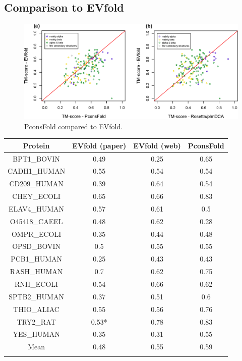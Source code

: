 \documentclass{bioinfo}
\begin{document}
\subsection{Comparison to EVfold}

\begin{figure}[!tpb]%
    \centerline{\includegraphics[scale=0.35]{figures/vs.eps}}
\caption{PconsFold compared to EVfold.}\label{fig:vs}
\end{figure}

\begin{table}[!t]
{\begin{tabular}{cccc}\toprule
    Protein      & EVfold (paper) & EVfold (web) & PconsFold \\ \midrule
    BPT1\_BOVIN  & 0.49   & 0.25           & 0.65      \\
    CADH1\_HUMAN & 0.55   & 0.54           & 0.54      \\
    CD209\_HUMAN & 0.39   & 0.64           & 0.54      \\
    CHEY\_ECOLI  & 0.65   & 0.66           & 0.83      \\
    ELAV4\_HUMAN & 0.57   & 0.61           & 0.5       \\
    O45418\_CAEEL & 0.48   & 0.62           & 0.28      \\
    OMPR\_ECOLI  & 0.35   & 0.44           & 0.48      \\
    OPSD\_BOVIN  & 0.5    & 0.55           & 0.55      \\
    PCB1\_HUMAN  & 0.25   & 0.43           & 0.43      \\
    RASH\_HUMAN  & 0.7    & 0.62           & 0.75      \\
    RNH\_ECOLI   & 0.54   & 0.66           & 0.62      \\
    SPTB2\_HUMAN & 0.37   & 0.51           & 0.6       \\
    THIO\_ALIAC  & 0.55   & 0.56           & 0.76      \\
    TRY2\_RAT    & 0.53*  & 0.78           & 0.83      \\
    YES\_HUMAN   & 0.35   & 0.31           & 0.55      \\ \midrule
    Mean         & 0.48   & 0.55           & 0.59      \\ \botrule
\end{tabular}}{}
\end{table}
\end{document}
